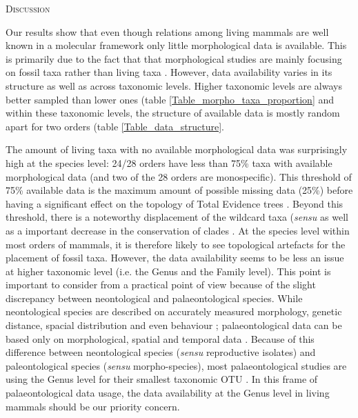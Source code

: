 \documentclass[12pt,letterpaper]{article}
\renewcommand{\section}[1]{%
\bigskip
\begin{center}
\begin{Large}
\normalfont\scshape #1
\medskip
\end{Large}
\end{center}}
\renewcommand{\subsection}[1]{%
\bigskip
\begin{center}
\begin{large}
\normalfont\itshape #1
\end{large}
\end{center}}
\begin{document}


%
%

\section{Discussion}
Our results show that even though relations among living mammals are well known in a molecular framework \citep[e.g.][]{FritzTree,meredithimpacts2011,May-Collado-PeerJ} only little morphological data is available. This is primarily due to the fact that that morphological studies are mainly focusing on fossil taxa rather than living taxa \citep[e.g.][]{O'Leary08022013,ni2013oldest}. However, data availability varies in its structure as well as across taxonomic levels. Higher taxonomic levels are always better sampled than lower ones (table \ref{Table_morpho_taxa_proportion} and within these taxonomic levels, the structure of available data is mostly random apart for two orders (table \ref{Table_data_structure}.

The amount of living taxa with no available morphological data was surprisingly high at the species level: 24/28 orders have less than 75\% taxa with available morphological data (and two of the 28 orders are monospecific). This threshold of 75\% available data is the maximum amount of possible missing data (25\%) before having a significant effect on the topology of Total Evidence trees \citep{GuillermeCooper}. Beyond this threshold, there is a noteworthy displacement of the wildcard taxa (\textit{sensu} \citep{kearneyfragmentary2002} as well as a important decrease in the conservation of clades \citep{GuillermeCooper}. At the species level within most orders of mammals, it is therefore likely to see topological artefacts for the placement of fossil taxa. However, the data availability seems to be less an issue at higher taxonomic level (i.e. the Genus and the Family level). This point is important to consider from a practical point of view because of the slight discrepancy between neontological and palaeontological species. While neontological species are described on accurately measured morphology, genetic distance, spacial distribution and even behaviour \citep[e.g.][]{kellymolecular2014}; palaeontological data can be based only on morphological, spatial and temporal data \citep[e.g.][]{ni2013oldest}. Because of this difference between neontological species (\textit{sensu} reproductive isolates) and paleontological species (\textit{sensu} morpho-species), most palaeontological studies are using the Genus level for their smallest taxonomic OTU \citep[e.g.][]{ni2013oldest,O'Leary08022013}. In this frame of palaeontological data usage, the data availability at the Genus level in living mammals should be our priority concern.
\end{document}
